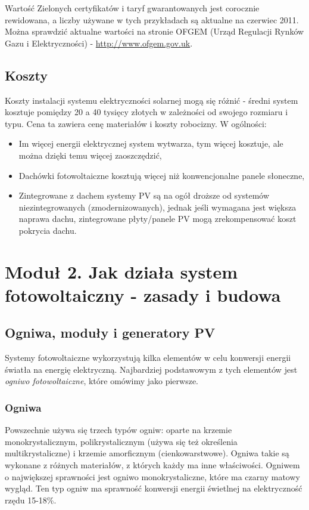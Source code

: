 \documentclass[12pt,a4paper]{article}
\begin{document}
Wartość Zielonych certyfikatów i taryf gwarantowanych jest corocznie 
rewidowana, a liczby używane w tych przykładach są aktualne na czerwiec 
2011. Można sprawdzić aktualne wartości na stronie OFGEM (Urząd 
Regulacji Rynków Gazu i Elektryczności) - \underline{http://www.ofgem.gov.uk}. 

\subsection{Koszty} 
Koszty instalacji systemu elektryczności solarnej mogą 
się różnić - średni system kosztuje pomiędzy 20 a 40 tysięcy złotych w 
zależności od swojego rozmiaru i typu. Cena ta zawiera cenę materiałów i 
koszty robocizny. W ogólności: 

\begin{itemize}
\item Im więcej energii elektrycznej system wytwarza, tym więcej 
kosztuje, ale można dzięki temu więcej zaoszczędzić, 
\item Dachówki fotowoltaiczne kosztują więcej niż konwencjonalne panele 
słoneczne, 
\item Zintegrowane z dachem systemy PV  są na ogół droższe od systemów 
niezintegrowanych (zmodernizowanych), jednak jeśli wymagana jest większa naprawa dachu, zintegrowane płyty/panele PV mogą zrekompensować koszt pokrycia dachu.
\end{itemize}

\section{Moduł 2. Jak działa system fotowoltaiczny - zasady i budowa }
\subsection{Ogniwa, moduły i generatory PV}

Systemy fotowoltaiczne wykorzystują kilka elementów w celu konwersji 
energii światła na energię elektryczną. Najbardziej podstawowym z tych 
elementów jest \textit{ogniwo fotowoltaiczne}, które omówimy jako pierwsze. 

\subsubsection{Ogniwa}
Powszechnie używa się trzech typów ogniw: oparte na 
krzemie monokrystalicznym, polikrystalicznym (używa się też określenia 
multikrystaliczne) i krzemie amorficznym (cienkowarstwowe). Ogniwa takie są wykonane z różnych materiałów, z 
których każdy ma inne właściwości. Ogniwem o największej sprawności jest 
ogniwo monokrystaliczne, które ma czarny matowy wygląd. Ten typ ogniw ma 
sprawność konwersji energii świetlnej na elektryczność rzędu 15-18\%. 
\end{document}
